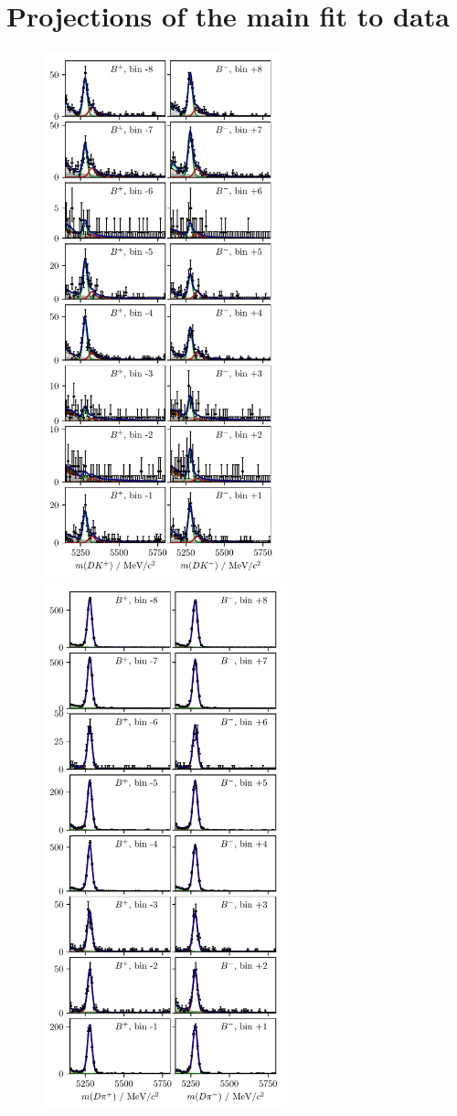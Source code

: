 
\chapter{Projections of the main fit to data}
\label{app:main_fit}

\begin{figure}[tp]
    \centering
    \includegraphics[height=6in]{figures/analysis/bin_by_bin/pretty_fit_bins_dk_LL_1.pdf}
    \includegraphics[height=6in]{figures/analysis/bin_by_bin/pretty_fit_bins_dpi_LL_1.pdf}

\end{figure}
